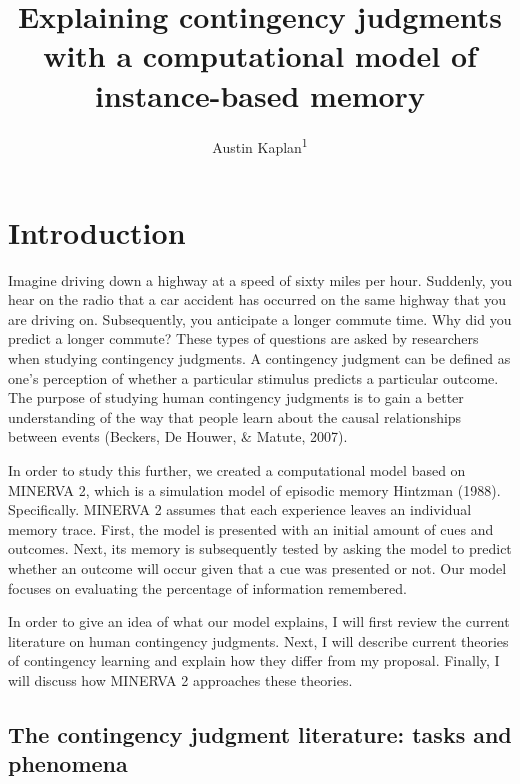 \documentclass[
  english,
  man,floatsintext]{apa6}
\title{Explaining contingency judgments with a computational model of instance-based memory}
\author{Austin Kaplan\textsuperscript{1}}
\date{}
\affiliation{\vspace{0.5cm}\textsuperscript{1} Brooklyn College}
\begin{document}
\maketitle

\hypertarget{introduction}{%
\section{Introduction}\label{introduction}}

Imagine driving down a highway at a speed of sixty miles per hour. Suddenly, you hear on the radio that a car accident has occurred on the same highway that you are driving on. Subsequently, you anticipate a longer commute time. Why did you predict a longer commute? These types of questions are asked by researchers when studying contingency judgments. A contingency judgment can be defined as one's perception of whether a particular stimulus predicts a particular outcome. The purpose of studying human contingency judgments is to gain a better understanding of the way that people learn about the causal relationships between events (Beckers, De Houwer, \& Matute, 2007).

In order to study this further, we created a computational model based on MINERVA 2, which is a simulation model of episodic memory Hintzman (1988). Specifically. MINERVA 2 assumes that each experience leaves an individual memory trace. First, the model is presented with an initial amount of cues and outcomes. Next, its memory is subsequently tested by asking the model to predict whether an outcome will occur given that a cue was presented or not. Our model focuses on evaluating the percentage of information remembered.

In order to give an idea of what our model explains, I will first review the current literature on human contingency judgments. Next, I will describe current theories of contingency learning and explain how they differ from my proposal. Finally, I will discuss how MINERVA 2 approaches these theories.

\hypertarget{the-contingency-judgment-literature-tasks-and-phenomena}{%
\subsection{The contingency judgment literature: tasks and phenomena}\label{the-contingency-judgment-literature-tasks-and-phenomena}}
\end{document}
